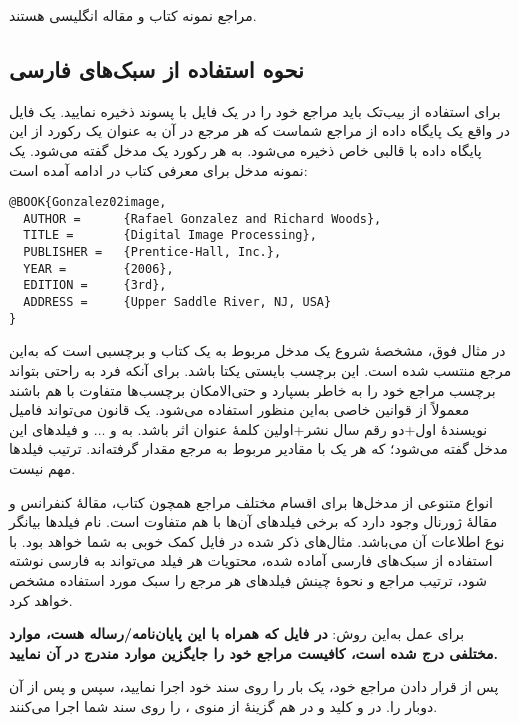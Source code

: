 مراجع 
\cite{Gonzalez02book,Baker02limits} 
نمونه کتاب و مقاله انگلیسی هستند.


\subsection{ نحوه استفاده از سبک‌های فارسی}


برای استفاده از بیب‌تک باید مراجع خود را در یک فایل با پسوند  ذخیره نمایید. یک فایل  در واقع یک پایگاه داده از مراجع  شماست که هر مرجع در آن به عنوان یک رکورد از این پایگاه داده
با قالبی خاص ذخیره می‌شود. به هر رکورد یک مدخل گفته می‌شود. یک نمونه مدخل برای معرفی کتاب  در ادامه آمده است:

\begin{Verbatim}
@BOOK{Gonzalez02image,
  AUTHOR =      {Rafael Gonzalez and Richard Woods},
  TITLE =       {Digital Image Processing},
  PUBLISHER =   {Prentice-Hall, Inc.},
  YEAR =        {2006},
  EDITION =     {3rd},
  ADDRESS =     {Upper Saddle River, NJ, USA}
}
\end{Verbatim}

در مثال فوق،  مشخصهٔ شروع یک مدخل مربوط به یک کتاب و  برچسبی است که به‌این مرجع منتسب شده است.
 این برچسب بایستی یکتا باشد. برای آنکه فرد به راحتی بتواند برچسب مراجع خود را به خاطر بسپارد و حتی‌الامکان برچسب‌ها متفاوت با هم باشند معمولاً از قوانین خاصی به‌این منظور استفاده می‌شود. یک قانون می‌تواند فامیل نویسندهٔ اول+دو رقم سال نشر+اولین کلمهٔ عنوان اثر باشد. به  و $\dots$ و  فیلدهای این مدخل گفته می‌شود؛ که هر یک با مقادیر مربوط به مرجع مقدار گرفته‌اند. ترتیب فیلدها مهم نیست. 

انواع متنوعی از مدخل‌ها برای اقسام مختلف مراجع همچون کتاب، مقالهٔ کنفرانس و مقالهٔ ژورنال وجود دارد که برخی فیلدهای آن‌ها با هم متفاوت است. 
نام فیلدها بیانگر نوع اطلاعات آن می‌باشد. مثال‌های ذکر شده در فایل  کمک خوبی به شما خواهد بود. 
با استفاده از سبک‌های فارسی آماده شده، محتویات هر فیلد می‌تواند به فارسی نوشته شود، ترتیب مراجع و نحوهٔ چینش فیلدهای هر مرجع را سبک مورد استفاده  مشخص خواهد کرد.

برای عمل به‌این روش: 
\textbf{در فایل 
 که همراه با این پایان‌نامه/رساله هست، موارد مختلفی درج شده است، کافیست مراجع خود را جایگزین موارد مندرج در آن نمایید.}

پس از قرار دادن مراجع خود، یک بار  را روی سند خود اجرا نمایید، سپس  و پس از آن دوبار  را. 
در 
 و
 کلید  و در  هم گزینهٔ  از منوی ،  را روی سند شما اجرا می‌کنند.

